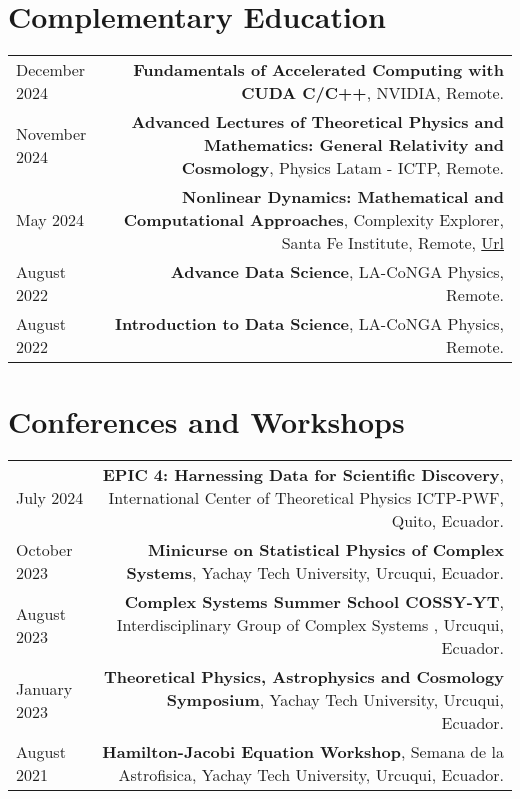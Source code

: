 \documentclass{article}
\begin{document}
\section*{Complementary Education}
\begin{tabular}{L!{\vrule}R}
	
	  December 2024 & \textbf{Fundamentals of Accelerated Computing with CUDA C/C++}, NVIDIA, Remote.\\
    November 2024 & \textbf{Advanced Lectures of Theoretical Physics and Mathematics: General Relativity and Cosmology}, Physics Latam - ICTP, Remote. \\ 

    May 2024 & \textbf{Nonlinear Dynamics: Mathematical and Computational Approaches}, Complexity Explorer, Santa Fe Institute, Remote, \href{https://www.complexityexplorer.org/courses/184-nonlinear-dynamics-mathematical-and-computational-approaches/certificates/3966304258}{Url}\\

    August 2022 & \textbf{Advance Data Science}, LA-CoNGA Physics, Remote. \\

    August 2022 & \textbf{Introduction to Data Science}, LA-CoNGA Physics, Remote. \\


\end{tabular}

\section*{Conferences and Workshops}
\begin{tabular}{L!{\vrule}R}

    July 2024 & \textbf{EPIC 4: Harnessing Data for Scientific Discovery}, International Center of Theoretical Physics ICTP-PWF, Quito, Ecuador.\\
    
    October 2023 & \textbf{Minicurse on Statistical Physics of Complex Systems}, Yachay Tech University, Urcuqui, Ecuador. \\

    August 2023 & \textbf{Complex Systems Summer School COSSY-YT}, Interdisciplinary Group of Complex Systems , Urcuqui, Ecuador. \\

    January 2023 & \textbf{Theoretical Physics, Astrophysics and Cosmology Symposium}, Yachay Tech University, Urcuqui, Ecuador. \\

    August 2021 & \textbf{Hamilton-Jacobi Equation Workshop}, Semana de la Astrofisica, Yachay Tech University, Urcuqui, Ecuador. \\



\end{tabular}
\end{document}
